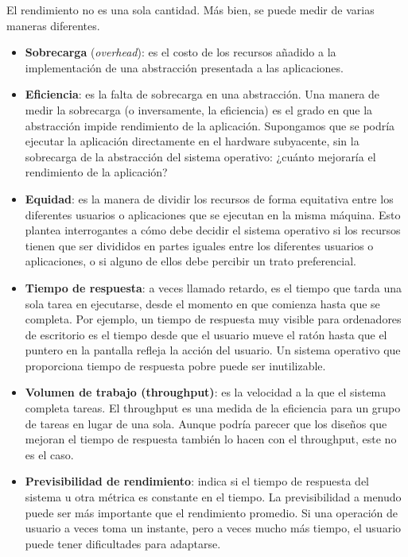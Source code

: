 \documentclass[10pt]{book}
\begin{document}
El rendimiento no es una sola cantidad. Más bien, se puede medir de varias maneras diferentes. 
\begin{itemize}
\item \textbf{Sobrecarga} (\textit{overhead}): es el costo de los recursos añadido a la implementación de una abstracción presentada a las aplicaciones. 
\item \textbf{Eficiencia}: es la falta de sobrecarga en una abstracción. Una manera de medir la sobrecarga (o inversamente, la eficiencia) es el grado en que la abstracción impide rendimiento de la aplicación. Supongamos que se podría ejecutar la aplicación directamente en el hardware subyacente, sin la sobrecarga de la abstracción del sistema operativo: ¿cuánto mejoraría el rendimiento de la aplicación?

\item \textbf{Equidad}: es la manera de dividir los recursos de forma equitativa entre los diferentes usuarios o aplicaciones que se ejecutan en la misma máquina. Esto plantea interrogantes a cómo debe decidir el sistema operativo si los recursos tienen que ser divididos en partes iguales entre los diferentes usuarios o aplicaciones, o si alguno de ellos debe percibir un trato preferencial.

\item \textbf{Tiempo de respuesta}: a veces llamado retardo, es el tiempo que tarda una sola tarea en ejecutarse, desde el momento en que comienza hasta que se completa. Por ejemplo, un tiempo de respuesta muy visible para ordenadores de escritorio es el tiempo desde que el usuario mueve el ratón hasta que el puntero en la pantalla refleja la acción del usuario. Un sistema operativo que proporciona tiempo de respuesta pobre puede ser inutilizable.

\item \textbf{Volumen de trabajo (throughput)}: es la velocidad a la que el sistema completa tareas. El throughput es una medida de la eficiencia para un grupo de tareas en lugar de una sola. Aunque podría parecer que los diseños que mejoran el tiempo de respuesta también lo hacen con el throughput, este no es el caso.

\item \textbf{Previsibilidad de rendimiento}: indica si el tiempo de respuesta del sistema u otra métrica es constante en el tiempo. La previsibilidad a menudo puede ser más importante que el rendimiento promedio. Si una operación de usuario a veces toma un instante, pero a veces mucho más tiempo, el usuario puede tener dificultades para adaptarse.
\end{itemize}
\end{document}
